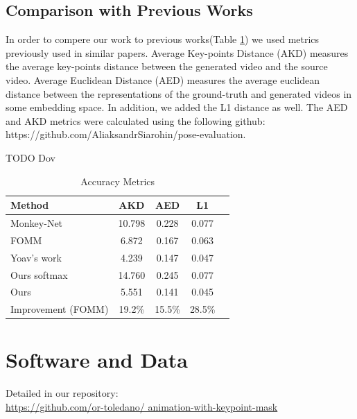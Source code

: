 \documentclass{article}
\begin{document}
\subsection{Comparison with Previous Works}
In order to compere our work to previous works(Table \ref{table:results}) we used metrics previously used in similar papers. Average Key-points Distance \cite{cao2017realtime} (AKD) measures the average key-points distance between the generated video and the source video. Average Euclidean Distance \cite{zheng2019joint}  (AED) measures the average euclidean distance
 between the representations of the ground-truth and generated videos in some embedding space. In addition, we added the L1 distance as well. The AED and AKD metrics were calculated using the following github: https://github.com/AliaksandrSiarohin/pose-evaluation.


\label{results}
TODO Dov

\begin{table}[t]
\caption{Accuracy Metrics}
\label{table:results}
\vskip 0.15in
\begin{center}
\begin{small}
\begin{sc}
\begin{tabular}{lcccr}
\toprule
Method & AKD & AED & L1 \\
\midrule
Monkey-Net    & 10.798 & 0.228 & 0.077 \\
FOMM    & 6.872 & 0.167 & 0.063 \\
Yoav's work & 4.239 & 0.147 & 0.047 \\
Ours softmax & 14.760& 0.245 & 0.077 \\
Ours & 5.551 & 0.141 &  0.045\\
\midrule
Improvement (FOMM)    & 19.2\% & 15.5\% & 28.5\% \\
\bottomrule
\end{tabular}
\end{sc}
\end{small}
\end{center}
\vskip -0.1in
\end{table}
\section*{Software and Data}
Detailed in our repository:
\\
\url{https://github.com/or-toledano/
animation-with-keypoint-mask}


\end{document}
